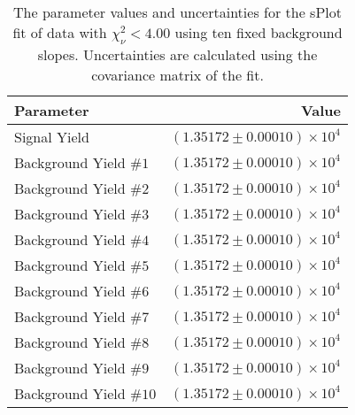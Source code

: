 
\begin{table}[ht]
    \begin{center}
        \begin{tabular}{lr}\toprule
            Parameter & Value \\\midrule
            Signal Yield & $(1.35172 \pm 0.00010) \times 10^{4}$ \\
            Background Yield $\#1$ & $(1.35172 \pm 0.00010) \times 10^{4}$ \\
            Background Yield $\#2$ & $(1.35172 \pm 0.00010) \times 10^{4}$ \\
            Background Yield $\#3$ & $(1.35172 \pm 0.00010) \times 10^{4}$ \\
            Background Yield $\#4$ & $(1.35172 \pm 0.00010) \times 10^{4}$ \\
            Background Yield $\#5$ & $(1.35172 \pm 0.00010) \times 10^{4}$ \\
            Background Yield $\#6$ & $(1.35172 \pm 0.00010) \times 10^{4}$ \\
            Background Yield $\#7$ & $(1.35172 \pm 0.00010) \times 10^{4}$ \\
            Background Yield $\#8$ & $(1.35172 \pm 0.00010) \times 10^{4}$ \\
            Background Yield $\#9$ & $(1.35172 \pm 0.00010) \times 10^{4}$ \\
            Background Yield $\#10$ & $(1.35172 \pm 0.00010) \times 10^{4}$ \\\bottomrule
        \end{tabular}
        \caption{The parameter values and uncertainties for the sPlot fit of data with $\chi^2_\nu < 4.00$ using ten fixed background slopes. Uncertainties are calculated using the covariance matrix of the fit.}\label{tab:splot-fit-results-chisqdof-4.00-fixed-10}
    \end{center}
\end{table}
